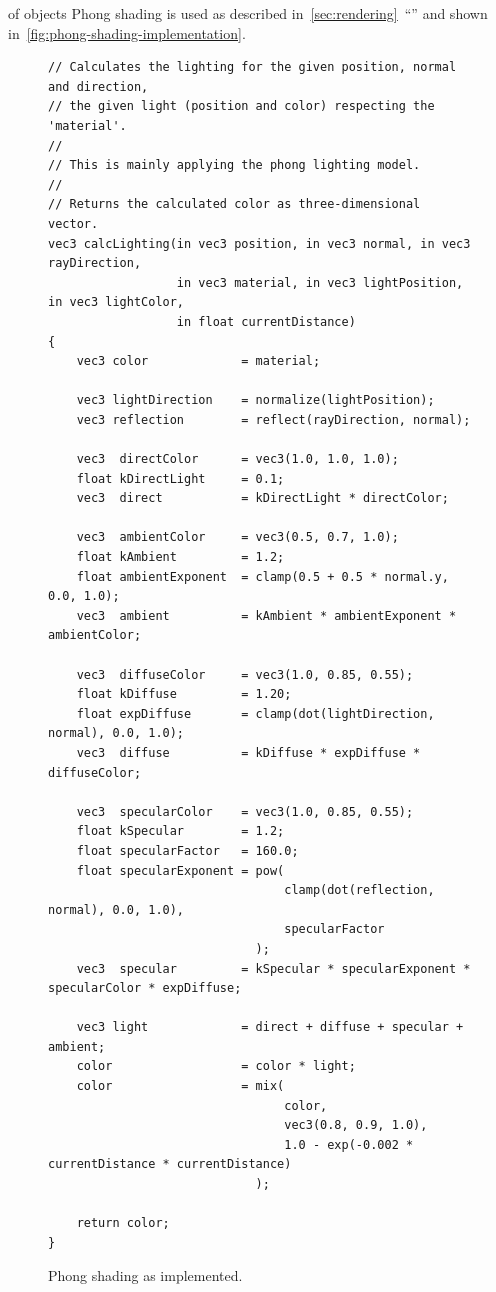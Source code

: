 \documentclass[%
    a4paper,    %
    justified,  %
    nobib,      %
    openany     %
]{tufte-book}
\makeatletter
\renewcommand{\label}[1]{\@tufte@label{##1}}%
\makeatother
\begin{document}
 of objects Phong shading is used as
described in~\cref{sec:rendering}~\enquote{}
and shown in~\cref{fig:phong-shading-implementation}.

\begin{figure}
  \begin{verbatim}
// Calculates the lighting for the given position, normal and direction,
// the given light (position and color) respecting the 'material'.
//
// This is mainly applying the phong lighting model.
//
// Returns the calculated color as three-dimensional vector.
vec3 calcLighting(in vec3 position, in vec3 normal, in vec3 rayDirection,
                  in vec3 material, in vec3 lightPosition, in vec3 lightColor,
                  in float currentDistance)
{
    vec3 color             = material;

    vec3 lightDirection    = normalize(lightPosition);
    vec3 reflection        = reflect(rayDirection, normal);

    vec3  directColor      = vec3(1.0, 1.0, 1.0);
    float kDirectLight     = 0.1;
    vec3  direct           = kDirectLight * directColor;

    vec3  ambientColor     = vec3(0.5, 0.7, 1.0);
    float kAmbient         = 1.2;
    float ambientExponent  = clamp(0.5 + 0.5 * normal.y, 0.0, 1.0);
    vec3  ambient          = kAmbient * ambientExponent * ambientColor;

    vec3  diffuseColor     = vec3(1.0, 0.85, 0.55);
    float kDiffuse         = 1.20;
    float expDiffuse       = clamp(dot(lightDirection, normal), 0.0, 1.0);
    vec3  diffuse          = kDiffuse * expDiffuse * diffuseColor;

    vec3  specularColor    = vec3(1.0, 0.85, 0.55);
    float kSpecular        = 1.2;
    float specularFactor   = 160.0;
    float specularExponent = pow(
                                 clamp(dot(reflection, normal), 0.0, 1.0),
                                 specularFactor
                             );
    vec3  specular         = kSpecular * specularExponent * specularColor * expDiffuse;

    vec3 light             = direct + diffuse + specular + ambient;
    color                  = color * light;
    color                  = mix(
                                 color,
                                 vec3(0.8, 0.9, 1.0),
                                 1.0 - exp(-0.002 * currentDistance * currentDistance)
                             );

    return color;
}
  \end{verbatim}
\caption{Phong shading as implemented.}
\label{fig:phong-shading-implementation}
\end{figure}
\end{document}
